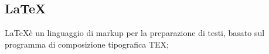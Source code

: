 \section{}
\subsection*{\LaTeX} \LaTeX è un linguaggio di markup per la preparazione di testi, basato sul programma di composizione tipografica TEX;
